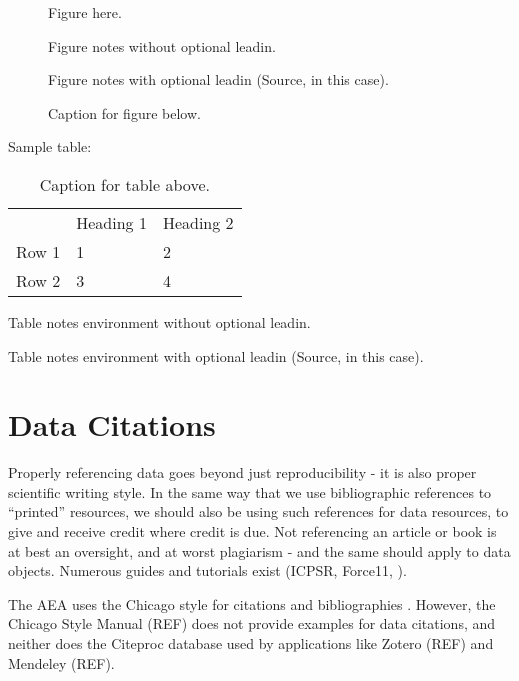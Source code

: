 \documentclass[AEJ]{AEA}
\begin{document}
\begin{figure}
Figure here.

\caption{Caption for figure below.}
\begin{figurenotes}
Figure notes without optional leadin.
\end{figurenotes}
\begin{figurenotes}[Source]
Figure notes with optional leadin (Source, in this case).
\end{figurenotes}
\end{figure}

Sample table:

\begin{table}
\caption{Caption for table above.}

\begin{tabular}{lll}
& Heading 1 & Heading 2 \\ 
Row 1 & 1 & 2 \\ 
Row 2 & 3 & 4%
\end{tabular}
\begin{tablenotes}
Table notes environment without optional leadin.
\end{tablenotes}
\begin{tablenotes}[Source]
Table notes environment with optional leadin (Source, in this case).
\end{tablenotes}
\end{table}

\section{Data Citations}
Properly referencing data goes beyond just reproducibility - it is also proper scientific writing style. In the same way that we use bibliographic references to ``printed'' resources, we should also be using such references for data resources, to give and receive credit where credit is due. Not referencing an article or book is at best an oversight, and at worst plagiarism - and the same should apply to data objects. Numerous guides and tutorials exist (ICPSR, Force11, \cite{dataone-l09}).

The AEA uses the Chicago style for citations and bibliographies \citep{aeadatarefs}. However, the Chicago Style Manual (REF) does not provide examples for data citations, and neither does the Citeproc database used by applications like Zotero (REF) and Mendeley (REF).
\end{document}
